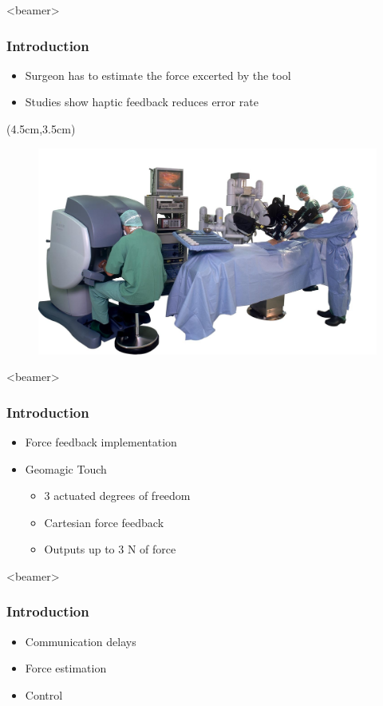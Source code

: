 \begin{frame}<beamer>
\frametitle{Introduction}
\begin{itemize}
\item Surgeon has to estimate the force excerted by the tool
\item Studies show haptic feedback reduces error rate
\end{itemize}

\begin{textblock*}{0.7\textwidth}(4.5cm,3.5cm) %
  \begin{figure}[H]
  	\centering
  		\centering
  		\includegraphics[width=1\textwidth]{Billeder/Dan/davinci.jpg}
  \end{figure}
\end{textblock*}

\end{frame}

\begin{frame}<beamer>
\frametitle{Introduction}
\begin{itemize}
\item Force feedback implementation
\item Geomagic Touch 
\begin{itemize}
\item 3 actuated degrees of freedom 
\item Cartesian force feedback
\item Outputs up to 3 N of force
\end{itemize}
\end{itemize}
\end{frame}

\begin{frame}<beamer>
\frametitle{Introduction}
\begin{itemize}
\item Communication delays
\item Force estimation
\item Control
\end{itemize}
\end{frame}